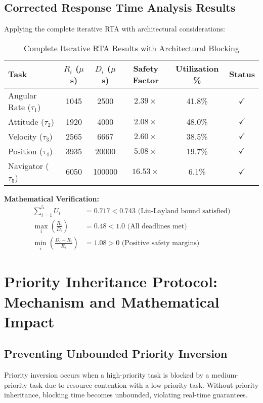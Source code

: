 \documentclass[12pt,a4paper]{article}
\begin{document}
\subsection{Corrected Response Time Analysis Results}

Applying the complete iterative RTA with architectural considerations:

\begin{table}[H]
\centering
\begin{tabular}{|l|c|c|c|c|c|}
\hline
\textbf{Task} & \textbf{$R_i$ ($\mu$s)} & \textbf{$D_i$ ($\mu$s)} & \textbf{Safety Factor} & \textbf{Utilization \%} & \textbf{Status} \\
\hline
Angular Rate ($\tau_1$) & 1045 & 2500 & $2.39\times$ & 41.8\% & $\checkmark$ \\
Attitude ($\tau_2$) & 1920 & 4000 & $2.08\times$ & 48.0\% & $\checkmark$ \\
Velocity ($\tau_3$) & 2565 & 6667 & $2.60\times$ & 38.5\% & $\checkmark$ \\
Position ($\tau_4$) & 3935 & 20000 & $5.08\times$ & 19.7\% & $\checkmark$ \\
Navigator ($\tau_5$) & 6050 & 100000 & $16.53\times$ & 6.1\% & $\checkmark$ \\
\hline
\end{tabular}
\caption{Complete Iterative RTA Results with Architectural Blocking}
\end{table}

\textbf{Mathematical Verification:}
\begin{align}
\sum_{i=1}^5 U_i &= 0.717 < 0.743 \text{ (Liu-Layland bound satisfied)} \\
\max_i \left(\frac{R_i}{D_i}\right) &= 0.48 < 1.0 \text{ (All deadlines met)} \\
\min_i \left(\frac{D_i - R_i}{R_i}\right) &= 1.08 > 0 \text{ (Positive safety margins)}
\end{align}

\section{Priority Inheritance Protocol: Mechanism and Mathematical Impact}

\subsection{Preventing Unbounded Priority Inversion}

Priority inversion occurs when a high-priority task is blocked by a medium-priority task due to resource contention with a low-priority task. Without priority inheritance, blocking time becomes unbounded, violating real-time guarantees.
\end{document}

